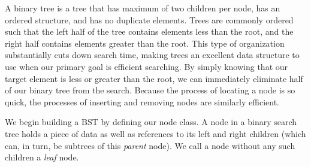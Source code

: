 A binary tree is a tree that has maximum of two children per node, has an ordered structure, and has no duplicate elements.
Trees are commonly ordered such that the left half of the tree contains elements less than the root, and the right half contains elements greater than the root.
This type of organization substantially cuts down search time, making trees an excellent data structure to use when our primary goal is efficient searching.
By simply knowing that our target element is less or greater than the root, we can immediately eliminate half of our binary tree from the search.
Because the process of locating a node is so quick, the processes of inserting and removing nodes are similarly efficient.

We begin building a BST by defining our node class. A node in a binary search tree holds a piece of data as well as references to its left and right children (which can, in turn, be subtrees of this \emph{parent} node).
We call a node without any such children a \emph{leaf} node.

